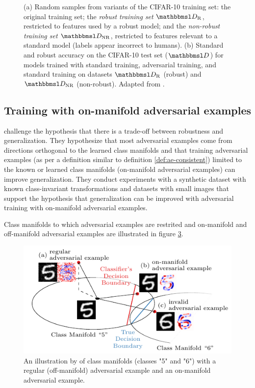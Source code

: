 \documentclass[oneside]{book}
\begin{document}
\begin{figure}[htbp!]
\begin{subfigure}[b]{0.5\textwidth}
		\caption{}
		\label{fig:robustify_cifar}
	\end{subfigure}
	\caption{
		(a) Random samples from variants of the
		CIFAR-10 training set:
		the original training set; 
		the \textit{robust training set} $\set D_\text{R}$, restricted to features used by a
		robust model; and
		the \textit{non-robust training set} $\set D_\text{NR}$, restricted to
		features relevant to a standard model (labels appear incorrect to humans).
		(b) Standard and robust accuracy on the CIFAR-10
		test set ($\set D$) for models trained with standard training, adversarial training, and standard training on datasets $\set D_\text{R}$ (robust) and $\set D_\text{NR}$ (non-robust). Adapted from \citet{Ilyas:2019:AENBTF}.}
	\label{fig:iliyas-experiment-results}
\end{figure}

\subsection{Training with on-manifold adversarial examples}

\citet{Stutz:2018:DARG} challenge the hypothesis that there is a trade-off between robustness and generalization. They hypothesize that most adversarial examples come from directions orthogonal to the learned class manifolds and that training adversarial examples (as per a definition similar to definition \ref{def:ae-consistent}) limited to the known or learned class manifolds (on-manifold adversarial examples) can improve generalization. They conduct experiments with a synthetic dataset with known class-invariant transformations and datasets with small images that support the hypothesis that generalization can be improved with adversarial training with on-manifold adversarial examples.

Class manifolds to which adversarial examples are restrited and on-manifold and off-manifold adversarial examples are illustrated in figure \ref{fig:stutz-illustration}.

\begin{figure}[htbp!]
	\begin{center}
		\includegraphics[width=\columnwidth]{figures/adversarial-examples/stutz-introduction_b.pdf}
	\end{center}
	\caption{An illustration by \citet{Stutz:2018:DARG} of class manifolds (classes "5" and "6") with a regular (off-manifold) adversarial example and an on-manifold adversarial example.}
	\label{fig:stutz-illustration}
\end{figure}
\end{document}
